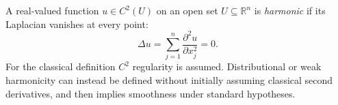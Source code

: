 
A real-valued function $u\in C^2(U)$ on an open set $U\subseteq\mathbb R^n$ is \emph{harmonic} if its Laplacian vanishes at every point:
\[
\Delta u=\sum_{j=1}^n\frac{\partial^2u}{\partial x_j^2}=0.
\]
For the classical definition $C^2$ regularity is assumed. Distributional or weak harmonicity can instead be defined without initially assuming classical second derivatives, and then implies smoothness under standard hypotheses.
